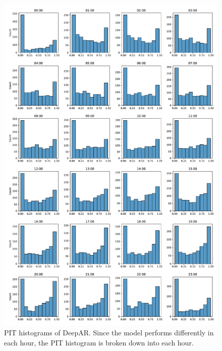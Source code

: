 \begin{figure}[h]%
    \centering
    \includegraphics[width=\textwidth]{plots/pit/pit_by_hour_deepar.pdf}
    \caption[PIT histograms DeepAR]{PIT histograms of DeepAR. Since the model performs differently 
    in each hour, the PIT histogram is broken down into each hour.}%
    \label{fig:pit-deepar-by-hour}%
\end{figure}

